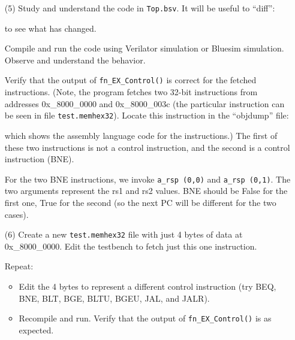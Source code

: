 \begin{itemize}

\item[(5)] Study and understand the code in \verb|Top.bsv|. It will be
    useful to ``diff'':

    to see what has changed.

    Compile and run the code using Verilator simulation or Bluesim
    simulation.  Observe and understand the behavior.

    Verify that the output of \verb|fn_EX_Control()| is correct for
    the fetched instructions. (Note, the program fetches two 32-bit
    instructions from addresses 0x\_8000\_0000 and 0x\_8000\_003c (the
    particular instruction can be seen in file \verb|test.memhex32|).
    Locate this instruction in the ``objdump'' file:


    which shows the assembly language code for the instructions.)
    The first of these two instructions is not a control
    instruction, and the second is a control instruction (BNE).

    For the two BNE instructions, we invoke \verb|a_rsp (0,0)| and
    \verb|a_rsp (0,1)|.  The two arguments represent the rs1 and rs2
    values.  BNE should be False for the first one, True for the
    second (so the next PC will be different for the two cases).

\item[(6)] Create a new \verb|test.memhex32| file with just 4 bytes of
    data at 0x\_8000\_0000.  Edit the testbench to fetch just this one
    instruction.

    Repeat:
    \begin{itemize}

    \item Edit the 4 bytes to represent a different control instruction
          (try BEQ, BNE, BLT, BGE, BLTU, BGEU, JAL, and JALR).

    \item Recompile and run. Verify that the output of
          \verb|fn_EX_Control()| is as expected.

    \end{itemize}

\end{itemize}

